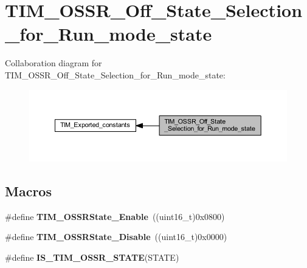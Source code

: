 \hypertarget{group___t_i_m___o_s_s_r___off___state___selection__for___run__mode__state}{}\section{T\+I\+M\+\_\+\+O\+S\+S\+R\+\_\+\+Off\+\_\+\+State\+\_\+\+Selection\+\_\+for\+\_\+\+Run\+\_\+mode\+\_\+state}
\label{group___t_i_m___o_s_s_r___off___state___selection__for___run__mode__state}
Collaboration diagram for T\+I\+M\+\_\+\+O\+S\+S\+R\+\_\+\+Off\+\_\+\+State\+\_\+\+Selection\+\_\+for\+\_\+\+Run\+\_\+mode\+\_\+state\+:
\nopagebreak
\begin{figure}[H]
\begin{center}
\leavevmode
\includegraphics[width=350pt]{group___t_i_m___o_s_s_r___off___state___selection__for___run__mode__state}
\end{center}
\end{figure}
\subsection*{Macros}
\begin{DoxyCompactItemize}
\item 
\mbox{\label{group___t_i_m___o_s_s_r___off___state___selection__for___run__mode__state_ga3703ba6189db045bec48c864289f997e}} 
\#define {\bfseries T\+I\+M\+\_\+\+O\+S\+S\+R\+State\+\_\+\+Enable}~((uint16\+\_\+t)0x0800)
\item 
\mbox{\label{group___t_i_m___o_s_s_r___off___state___selection__for___run__mode__state_ga766dfd8b3c32ec1b8b446f0e2dbe7b97}} 
\#define {\bfseries T\+I\+M\+\_\+\+O\+S\+S\+R\+State\+\_\+\+Disable}~((uint16\+\_\+t)0x0000)
\item 
\#define {\bfseries I\+S\+\_\+\+T\+I\+M\+\_\+\+O\+S\+S\+R\+\_\+\+S\+T\+A\+TE}(S\+T\+A\+TE)
\end{DoxyCompactItemize}


